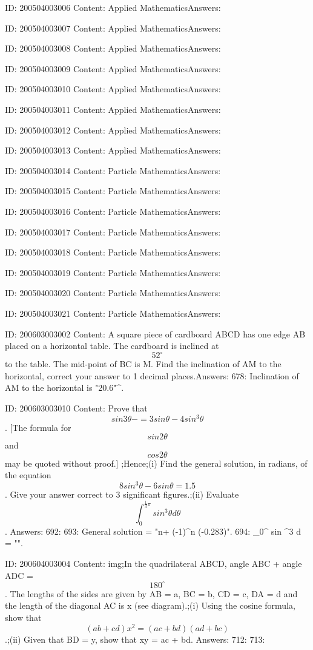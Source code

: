 \documentclass{article}
\begin{document}
ID: 200504003006
Content:
Applied MathematicsAnswers:

ID: 200504003007
Content:
Applied MathematicsAnswers:

ID: 200504003008
Content:
Applied MathematicsAnswers:

ID: 200504003009
Content:
Applied MathematicsAnswers:

ID: 200504003010
Content:
Applied MathematicsAnswers:

ID: 200504003011
Content:
Applied MathematicsAnswers:

ID: 200504003012
Content:
Applied MathematicsAnswers:

ID: 200504003013
Content:
Applied MathematicsAnswers:

ID: 200504003014
Content:
Particle MathematicsAnswers:

ID: 200504003015
Content:
Particle MathematicsAnswers:

ID: 200504003016
Content:
Particle MathematicsAnswers:

ID: 200504003017
Content:
Particle MathematicsAnswers:

ID: 200504003018
Content:
Particle MathematicsAnswers:

ID: 200504003019
Content:
Particle MathematicsAnswers:

ID: 200504003020
Content:
Particle MathematicsAnswers:

ID: 200504003021
Content:
Particle MathematicsAnswers:

ID: 200603003002
Content:
A square piece of cardboard ABCD has one edge AB placed on a horizontal table. The cardboard is inclined at $$52 ^ {\circ}$$ to the table. The mid-point of BC is M. Find the inclination of AM to the horizontal, correct your answer to 1 decimal places.Answers:
678: Inclination of AM to the horizontal is "20.6"^{\circ}.

ID: 200603003010
Content:
Prove that $$ sin 3 \theta  -= 3 sin \theta-4 sin^{3} \theta$$. [The formula for $$ sin 2 \theta$$ and $$ cos 2 \theta$$ may be quoted without proof.]  ;Hence;(i) Find the general solution, in radians, of the equation $$8 sin ^3 \theta - 6 sin \theta =1.5$$. Give your answer correct to 3 significant figures.;(ii) Evaluate $$ \int_{0}^{ \frac{1}{3} \pi  } sin ^3 \theta d \theta $$. Answers:
692: 
693: General solution = "n\pi + (-1)^n (-0.283)".
694:  \int_{0}^{  \pi  } sin ^3 \theta d \theta  = "".

ID: 200604003004
Content:
img;In the quadrilateral ABCD, angle ABC + angle ADC =  $$180^{\circ} $$. The lengths of the sides are given by AB = a, BC = b, CD = c, DA = d and the length of the diagonal AC is x (see diagram).;(i) Using the cosine formula, show that  $$( ab + cd )x^2  = ( ac + bd )( ad + bc )$$.;(ii) Given that BD = y, show that xy = ac + bd. Answers:
712: 
713: 
\end{document}

